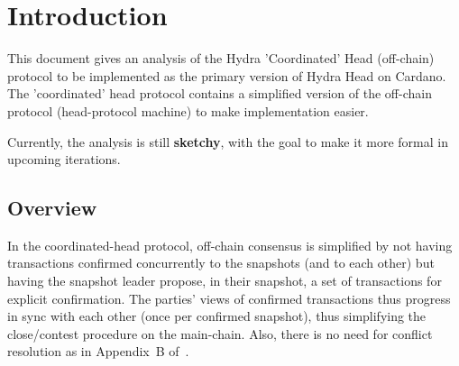\section{Introduction}
This document gives an analysis of the Hydra 'Coordinated' Head (off-chain) protocol to be implemented as
the primary version of Hydra Head on Cardano. The 'coordinated' head protocol contains a
simplified version of the off-chain protocol (head-protocol machine) to make implementation
easier.

Currently, the analysis is still \textbf{sketchy}, with the goal to make it more formal in upcoming
iterations.

\subsection{Overview}
In the coordinated-head protocol, off-chain consensus is simplified by not having transactions
confirmed concurrently to the snapshots (and to each other) but having the snapshot leader propose,
in their snapshot, a set of transactions for explicit confirmation. The parties' views of confirmed
transactions thus progress in sync with each other (once per confirmed snapshot), thus simplifying
the close/contest procedure on the main-chain. Also, there is no need for conflict resolution as
in Appendix~B of~\cite{hydrahead20}.


